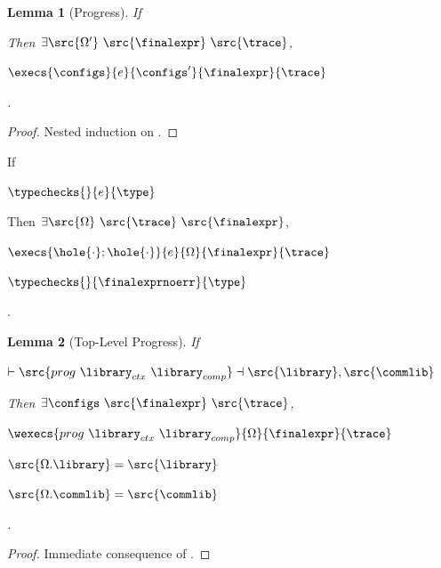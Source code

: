 \documentclass[a4paper,names,dvipsnames]{article}
\newtheorem{lemma}{Lemma}
\begin{document}
\begin{lemma}[Progress]\label{lem:progress}
  If
  Then $\exists \src{\Omega'}\ \src{\finalexpr}\ \src{\trace}$,
  \begin{goals}
  \item $\execs{\configs}{e}{\configs'}{\finalexpr}{\trace}$
  \end{goals}.
\end{lemma}
\begin{proof}
  Nested induction on .
\end{proof}

\begin{scontents}[store-env=buffer]
  If
  \begin{assumptions}
  \item $\typechecks{}{e}{\type}$
  \end{assumptions}
  Then $\exists \src{\Omega}\ \src{\trace}\ \src{\finalexpr}$,
  \begin{goals}
  \item $\execs{\hole{\cdot};\hole{\cdot}}{e}{\Omega}{\finalexpr}{\trace}$
  \item $\typechecks{}{\finalexprnoerr}{\type}$
  \end{goals}.
\end{scontents}

\begin{lemma}[Top-Level Progress]\label{lem:toplevel:progress}
  If
  \begin{assumptions}
    \item $\vdash\src{prog\ \library_{ctx}\ \library_{comp}}\dashv\src{\library},\src{\commlib}$
  \end{assumptions}
  Then $\exists \configs\ \src{\finalexpr}\ \src{\trace}$,
  \begin{goals}
  \item $\wexecs{prog\ \library_{ctx}\ \library_{comp}}{\Omega}{\finalexpr}{\trace}$
  \item $\src{\Omega.\library}=\src{\library}$
  \item $\src{\Omega.\commlib}=\src{\commlib}$
  \end{goals}.
\end{lemma}
\begin{proof}
  Immediate consequence of .
\end{proof}
\end{document}
